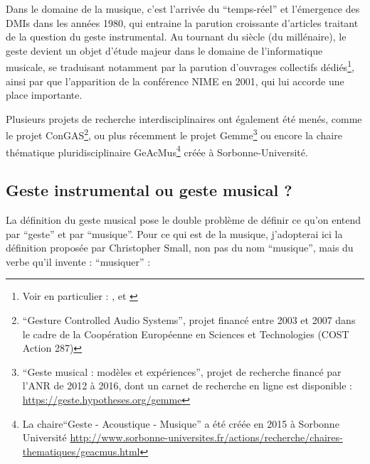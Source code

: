 Dans le domaine de la musique, c'est l'arrivée du ``temps-réel'' et l'émergence des \glspl{DMI} dans les années 1980, qui entraine la parution croissante d'articles traitant de la question du geste instrumental. Au tournant du siècle (du millénaire), le geste devient un objet d'étude majeur dans le domaine de l'informatique musicale, se traduisant notamment par la parution d'ouvrages collectifs dédiés\footnote{Voir en particulier : \cite{genevois_les_1999}, \cite{wanderley_trends_2000} et \cite{godoy_musical_2010}}, ainsi par que l'apparition de la conférence \gls{NIME} en 2001, qui lui accorde une place importante.

Plusieurs projets de recherche interdisciplinaires ont également été menés, comme le projet ConGAS\footnote{``Gesture Controlled Audio Systems'', projet financé entre 2003 et 2007 dans le cadre de la Coopération Européenne en Sciences et Technologies (COST Action 287)}, ou plus récemment le projet Gemme\footnote{``Geste musical : modèles et expériences'', projet de recherche financé par l'ANR de 2012 à 2016, dont un carnet de recherche en ligne est disponible : \url{https://geste.hypotheses.org/gemme}} ou encore la chaire thématique pluridisciplinaire GeAcMus\footnote{La chaire``Geste - Acoustique - Musique'' a été créée en 2015 à Sorbonne Université \url{http://www.sorbonne-universites.fr/actions/recherche/chaires-thematiques/geacmus.html}} créée à Sorbonne-Université.



\subsection{Geste instrumental ou geste musical ?}

La définition du geste musical pose le double problème de définir ce qu'on entend par ``geste'' et par ``musique''. Pour ce qui est de la musique, j'adopterai ici la définition proposée par Christopher Small, non pas du nom ``musique'', mais du verbe qu'il invente : ``musiquer'' \cite{small_musicking:_1998}:



